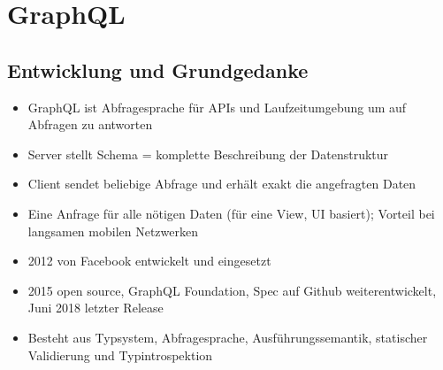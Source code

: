 \chapter{GraphQL}

\section{Entwicklung und Grundgedanke}
\begin{itemize}
  \item GraphQL ist Abfragesprache für APIs und Laufzeitumgebung um auf Abfragen zu antworten
  \item Server stellt Schema = komplette Beschreibung der Datenstruktur
  \item Client sendet beliebige Abfrage und erhält exakt die angefragten Daten
  \item Eine Anfrage für alle nötigen Daten (für eine View, UI basiert); Vorteil bei langsamen mobilen Netzwerken
  \item 2012 von Facebook entwickelt und eingesetzt
  \item 2015 open source, GraphQL Foundation, Spec auf Github weiterentwickelt, Juni 2018 letzter Release
  \item Besteht aus Typsystem, Abfragesprache, Ausführungssemantik, statischer Validierung und Typintrospektion
\end{itemize}

